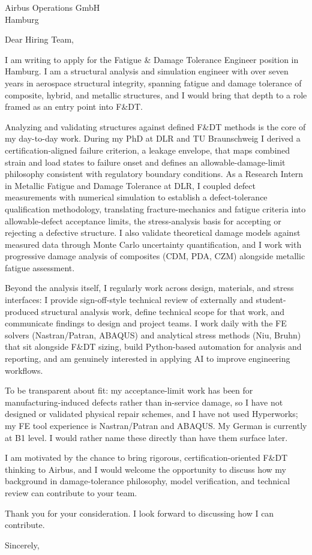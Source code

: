 \documentclass[10pt]{letter}
\begin{document}
\begin{letter}{Airbus Operations GmbH \\ Hamburg}
\opening{Dear Hiring Team,}

I am writing to apply for the Fatigue \& Damage Tolerance Engineer position in Hamburg. I am a structural analysis and simulation engineer with over seven years in aerospace structural integrity, spanning fatigue and damage tolerance of composite, hybrid, and metallic structures, and I would bring that depth to a role framed as an entry point into F\&DT.

Analyzing and validating structures against defined F\&DT methods is the core of my day-to-day work. During my PhD at DLR and TU Braunschweig I derived a certification-aligned failure criterion, a leakage envelope, that maps combined strain and load states to failure onset and defines an allowable-damage-limit philosophy consistent with regulatory boundary conditions. As a Research Intern in Metallic Fatigue and Damage Tolerance at DLR, I coupled defect measurements with numerical simulation to establish a defect-tolerance qualification methodology, translating fracture-mechanics and fatigue criteria into allowable-defect acceptance limits, the stress-analysis basis for accepting or rejecting a defective structure. I also validate theoretical damage models against measured data through Monte Carlo uncertainty quantification, and I work with progressive damage analysis of composites (CDM, PDA, CZM) alongside metallic fatigue assessment.

Beyond the analysis itself, I regularly work across design, materials, and stress interfaces: I provide sign-off-style technical review of externally and student-produced structural analysis work, define technical scope for that work, and communicate findings to design and project teams. I work daily with the FE solvers (Nastran/Patran, ABAQUS) and analytical stress methods (Niu, Bruhn) that sit alongside F\&DT sizing, build Python-based automation for analysis and reporting, and am genuinely interested in applying AI to improve engineering workflows.

To be transparent about fit: my acceptance-limit work has been for manufacturing-induced defects rather than in-service damage, so I have not designed or validated physical repair schemes, and I have not used Hyperworks; my FE tool experience is Nastran/Patran and ABAQUS. My German is currently at B1 level. I would rather name these directly than have them surface later.

I am motivated by the chance to bring rigorous, certification-oriented F\&DT thinking to Airbus, and I would welcome the opportunity to discuss how my background in damage-tolerance philosophy, model verification, and technical review can contribute to your team.

Thank you for your consideration. I look forward to discussing how I can contribute.

\closing{Sincerely,}
\end{letter}
\end{document}
